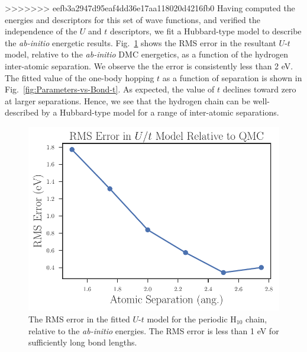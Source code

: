 >>>>>>> eefb3a2947d95eaf4dd36e17aa118020d4216fb0
Having computed the energies and descriptors for this set of wave functions, and verified the independence of the $U$ and $t$ descriptors, we fit a Hubbard-type model to describe the \textit{ab-initio} energetic results. Fig.~\ref{fig:RMS-Error-vs-Bond} shows the RMS error in the resultant $U$-$t$ model, relative to the \textit{ab-initio} DMC energetics, as a function of the hydrogen inter-atomic separation. We observe the the error is consistently less than 2 eV. The fitted value of the one-body hopping $t$ as a function of separation is shown in Fig.~\ref{fig:Parameters-vs-Bond-t}. As expected, the value of $t$ declines toward zero at larger separations. Hence, we see that the hydrogen chain can be well-described by a Hubbard-type model for a range of inter-atomic separations.

% 
 
 \begin{figure}
\centering
\includegraphics[scale=0.6]{./Figures/rms_ut_error_vs_separation_h_chain.pdf}
\caption{The RMS error in the fitted $U$-$t$ model for the periodic H$_{10}$ chain, relative to the \textit{ab-initio} energies. The RMS error is less than 1 eV for sufficiently long bond lengths.}\label{fig:RMS-Error-vs-Bond}
 \end{figure}
 
